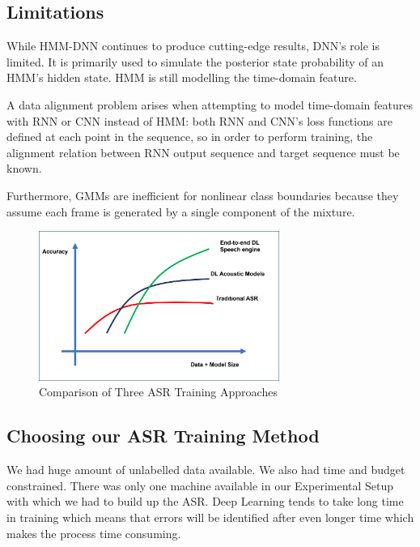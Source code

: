 \subsection{Limitations}
\label{sub:hybrid-asr-limits}

While HMM-DNN continues to produce cutting-edge results, DNN's role is limited. It is primarily used to simulate the posterior state probability of an HMM's hidden state. HMM is still modelling the time-domain feature.

A data alignment problem arises when attempting to model time-domain features with RNN or CNN instead of HMM: both RNN and CNN's loss functions are defined at each point in the sequence, so in order to perform training, the alignment relation between RNN output sequence and target sequence must be known.

Furthermore, GMMs are inefficient for nonlinear class boundaries because they assume each frame is generated by a single component of the mixture. \cite{backstrom_introduction_2022}

\begin{figure}[h!]
    \centering
    \includegraphics[width=0.7\textwidth]{img/ComparisonASRMODELS.png}
    \caption{Comparison of Three ASR Training Approaches \cite{naeem_subspace_2020}}
    \label{fig:comparison-all-asr-approach}
\end{figure}

\subsection{Choosing our ASR Training Method}
We had huge amount of unlabelled data available. We also had time and budget constrained. There was only one machine available in our Experimental Setup with which we had to build up the ASR. Deep Learning tends to take long time in training which means that errors will be identified after even longer time which makes the process time consuming. 


